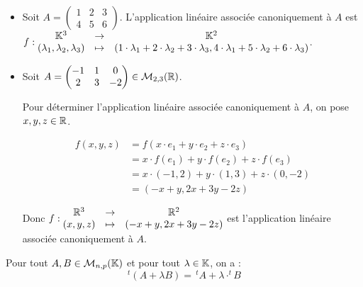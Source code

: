\documentclass[12pt, a4paper]{report}
\begin{document}
\begin{example}
    \begin{itemize}
        \item Soit $A = \left(\begin{matrix}
        1 & 2 & 3
        \\
        4 & 5 & 6
        \end{matrix}\right)$. L'application linéaire associée canoniquement à $A$ est $f : \begin{matrix} \mathbb{K}^3 &\to &\mathbb{K}^2 \\ (\lambda_1,\lambda_2,\lambda_3) &\mapsto &(1\cdot \lambda_1 + 2\cdot \lambda_2 + 3\cdot \lambda_3, 4\cdot \lambda_1 + 5\cdot \lambda_2 + 6\cdot \lambda_3) \end{matrix}$.
        \item Soit $A = \left(\begin{matrix}
        -1 & 1 & 0 \\
        2 & 3 & -2
        \end{matrix}\right) \in \mathcal M_{2,3}(\mathbb{R})$.
    
        Pour déterminer l'application linéaire associée canoniquement à $A$, on pose $x,y,z \in \mathbb{R}$.

        \begin{align*}
            f(x,y,z) &= f(x\cdot e_1 + y \cdot e_2 + z \cdot e_3)\\
            &= x \cdot f(e_1) + y \cdot f(e_2) + z \cdot f(e_3)\\
            &= x \cdot (-1,2) + y \cdot (1,3) + z \cdot (0,-2)\\
            &= (-x+y, 2x+3y-2z)
        \end{align*}

            Donc $f : \begin{matrix} \mathbb{R}^3 &\to &\mathbb{R}^2 \\ (x,y,z) &\mapsto &(-x+y, 2x+3y-2z) \end{matrix}$ est l'application linéaire associée canoniquement à $A$.
    \end{itemize}
\end{example}

\begin{theorem}[Lemme]
    Pour tout $A,B \in \mathcal M_{n,p}(\mathbb{K})$ et pour tout $\lambda \in \mathbb{K}$, on a :
    $$^t(A+\lambda B) = \,{^t}A + \lambda \cdot ^tB$$
    \label{th:transposée}
\end{theorem}
\end{document}
